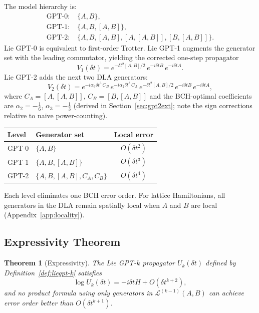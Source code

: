 \documentclass[aps,prxquantum,twocolumn,nofootinbib]{revtex4-2}
\newtheorem{theorem}{Theorem}
\begin{document}
The model hierarchy is:
\begin{align}
  \text{GPT-0:}&\;\{A,B\}, \label{eq:gpt0}\\
  \text{GPT-1:}&\;\{A,B,[A,B]\}, \label{eq:gpt1}\\
  \text{GPT-2:}&\;\{A,B,[A,B],[A,[A,B]],[B,[A,B]]\}. \label{eq:gpt2}
\end{align}
Lie GPT-0 is equivalent to first-order Trotter.
Lie GPT-1 augments the generator set with the leading commutator,
yielding the corrected one-step propagator
\begin{equation}
  V_1(\delta t)
  = e^{-\delta t^2[A,B]/2}\,e^{-i\delta t B}\,e^{-i\delta t A}.
  \label{eq:lc-step}
\end{equation}
Lie GPT-2 adds the next two DLA generators:
\begin{equation}
  V_2(\delta t)
  = e^{-i\alpha_3\delta t^3\,C_B}\,
    e^{-i\alpha_2\delta t^3\,C_A}\,
    e^{-\delta t^2[A,B]/2}\,
    e^{-i\delta t B}\,
    e^{-i\delta t A},
  \label{eq:gpt2-ansatz}
\end{equation}
where $C_A=[A,[A,B]]$, $C_B=[B,[A,B]]$ and the BCH-optimal
coefficients are
$\alpha_2 = -\tfrac{1}{6}$, $\alpha_3 = -\tfrac{1}{3}$
(derived in Section~\ref{sec:gpt2ext};
note the sign corrections relative to naive power-counting).

\begin{center}
\renewcommand{\arraystretch}{1.2}
\small
\begin{tabular}{llc}
\toprule
Level & Generator set & Local error \\
\midrule
GPT-0 & $\{A,B\}$ & $O(\delta t^2)$ \\
GPT-1 & $\{A,B,[A,B]\}$ & $O(\delta t^3)$ \\
GPT-2 & $\{A,B,[A,B],C_A,C_B\}$ & $O(\delta t^4)$ \\
\bottomrule
\end{tabular}
\end{center}

Each level eliminates one BCH error order.
For lattice Hamiltonians, all generators in the DLA remain
spatially local when $A$ and $B$ are local (Appendix~\ref{app:locality}).

\subsection{Expressivity Theorem}
\label{sec:expressivity}

\begin{theorem}[Expressivity]
  \label{thm:expressivity}
  The Lie GPT-$k$ propagator $U_k(\delta t)$ defined by
  Definition~\ref{def:liegpt-k} satisfies
  \begin{equation}
    \log U_k(\delta t) = -i\delta t H + O(\delta t^{k+2}),
    \label{eq:expressivity}
  \end{equation}
  and no product formula using only generators in
  $\mathcal{L}^{(k-1)}(A,B)$ can achieve error order
  better than $O(\delta t^{k+1})$.
\end{theorem}
\end{document}
